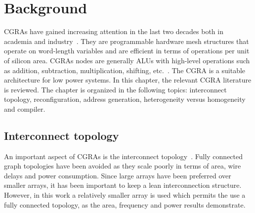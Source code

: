 
\chapter{Background}
\label{chapter:background}


CGRAs have gained increasing attention in the last two decades both in
academia and industry~\cite{Lee00,Mei05,Weinhardt03,Quax04,deSousa12}.
They are programmable hardware mesh structures that operate on
word-length variables and are efficient in terms of operations per
unit of silicon area. CGRAs nodes are generally ALUs with high-level
operations such as addition, subtraction, multiplication, shifting,
etc.~\cite{Tripp07}. The CGRA is a suitable architecture for low power
systems. In this chapter, the relevant CGRA literature is
reviewed. The chapter is organized in the following topics:
interconnect topology, reconfiguration, address generation,
heterogeneity versus homogeneity and compiler.


\section{Interconnect topology}

An important aspect of CGRAs is the interconnect
topology~\cite{Park09}. Fully connected graph topologies have been
avoided as they scale poorly in terms of area, wire delays and power
consumption. Since large arrays have been preferred over smaller
arrays, it has been important to keep a lean interconnection
structure. However, in this work a relatively smaller array is used
which permits the use a fully connected topology, as the area,
frequency and power results demonstrate.




